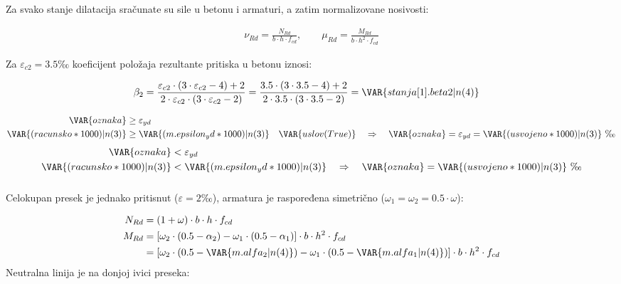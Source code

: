 Za svako stanje dilatacija sračunate su sile u betonu i armaturi, a zatim normalizovane nosivosti:

\begin{align*}
\nu_{Rd} = \frac{N_{Rd}}{b \cdot h \cdot f_{cd}}, \qquad \mu_{Rd} = \frac{M_{Rd}}{b \cdot h^2 \cdot f_{cd}}
\end{align*}

Za $\varepsilon_{c2} = 3.5$‰ koeficijent položaja rezultante pritiska u betonu iznosi:

\begin{align*}
\beta_2 &= \frac{\varepsilon_{c2} \cdot (3 \cdot \varepsilon_{c2} - 4) + 2}{2 \cdot \varepsilon_{c2} \cdot (3 \cdot \varepsilon_{c2} - 2)} = \frac{3.5 \cdot (3 \cdot 3.5 - 4) + 2}{2 \cdot 3.5 \cdot (3 \cdot 3.5 - 2)} = \VAR{stanja[1].beta2|n(4)}
\end{align*}

\begin{align*}
\VAR{oznaka} &\geq \varepsilon_{yd} \\
\VAR{(racunsko*1000)|n(3)} &\geq \VAR{(m.epsilon_yd*1000)|n(3)} \quad \VAR{uslov(True)} \quad \Rightarrow \quad \VAR{oznaka} = \varepsilon_{yd} = \VAR{(usvojeno*1000)|n(3)} \ \text{‰}
\end{align*}
\begin{align*}
\VAR{oznaka} &< \varepsilon_{yd} \\
\VAR{(racunsko*1000)|n(3)} &< \VAR{(m.epsilon_yd*1000)|n(3)} \quad \Rightarrow \quad \VAR{oznaka} = \VAR{(usvojeno*1000)|n(3)} \ \text{‰}
\end{align*}

\subsubsection{}

Celokupan presek je jednako pritisnut ($\varepsilon = 2$‰), armatura je raspoređena simetrično ($\omega_1 = \omega_2 = 0.5 \cdot \omega$):

\begin{align*}
N_{Rd} &= (1 + \omega) \cdot b \cdot h \cdot f_{cd} \\
M_{Rd} &= \left[\omega_2 \cdot (0.5 - \alpha_2) - \omega_1 \cdot (0.5 - \alpha_1)\right] \cdot b \cdot h^2 \cdot f_{cd} \\
&= \left[\omega_2 \cdot (0.5 - \VAR{m.alfa_2|n(4)}) - \omega_1 \cdot (0.5 - \VAR{m.alfa_1|n(4)})\right] \cdot b \cdot h^2 \cdot f_{cd}
\end{align*}
Neutralna linija je na donjoj ivici preseka:

